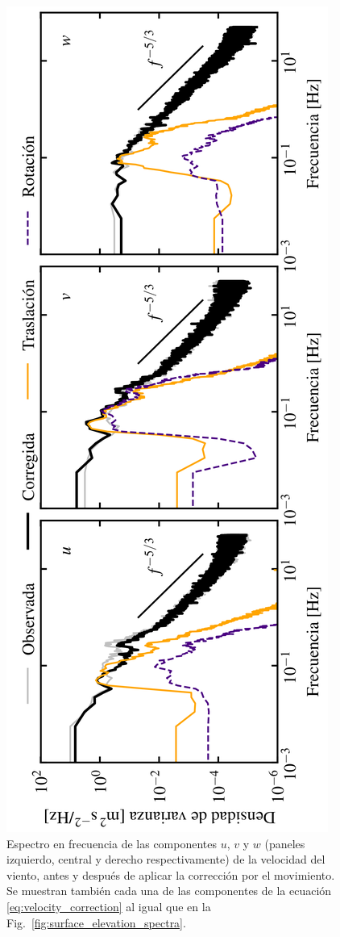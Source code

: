 \documentclass[11pt]{article}
\begin{document}
\begin{figure}[htpb]
  \centering
  \includegraphics[width=\linewidth]{./figures/velocity_spectra.png}
  \caption{
    Espectro en frecuencia de las componentes $u$, $v$ y $w$ (paneles izquierdo,
    central y derecho respectivamente) de la velocidad del viento, antes y
    después de aplicar la corrección por el movimiento. Se muestran también cada
    una de las componentes de la ecuación \eqref{eq:velocity_correction} al
    igual que en la Fig.~\ref{fig:surface_elevation_spectra}.
  }
  \label{fig:velocity_spectra}
\end{figure}
\end{document}
